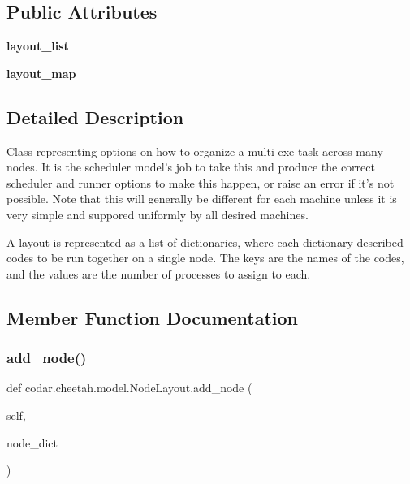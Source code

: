 \subsection*{Public Attributes}
\begin{DoxyCompactItemize}
\item 
\mbox{\label{classcodar_1_1cheetah_1_1model_1_1_node_layout_a3a2dd51c52a932bafd122b358607582c}} 
{\bfseries layout\+\_\+list}
\item 
\mbox{\label{classcodar_1_1cheetah_1_1model_1_1_node_layout_aa4d0e912fa0c19e4cf7b3b0203e6a6b4}} 
{\bfseries layout\+\_\+map}
\end{DoxyCompactItemize}


\subsection{Detailed Description}
\begin{DoxyVerb}Class representing options on how to organize a multi-exe task across
many nodes. It is the scheduler model's job to take this and produce the
correct scheduler and runner options to make this happen, or raise an error
if it's not possible. Note that this will generally be different for each
machine unless it is very simple and suppored uniformly by all desired
machines.

A layout is represented as a list of dictionaries, where each dictionary
described codes to be run together on a single node. The keys are
the names of the codes, and the values are the number of processes to
assign to each.
\end{DoxyVerb}
 

\subsection{Member Function Documentation}
\mbox{\label{classcodar_1_1cheetah_1_1model_1_1_node_layout_a60ed0982c3837eb355a4d6011e4f33ea}} 
\subsubsection{\texorpdfstring{add\+\_\+node()}{add\_node()}}
{\footnotesize\ttfamily def codar.\+cheetah.\+model.\+Node\+Layout.\+add\+\_\+node (\begin{DoxyParamCaption}\item[{}]{self,  }\item[{}]{node\+\_\+dict }\end{DoxyParamCaption})}

